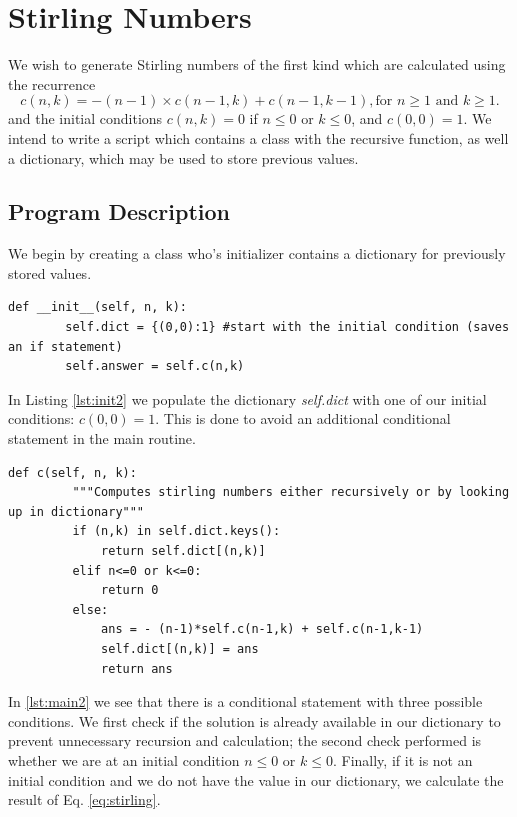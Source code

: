 \section{Stirling Numbers} %
\label{sec:stirling_numbers}
We wish to generate Stirling numbers of the first kind which are calculated using the recurrence
\begin{equation}
    \label{eq:stirling}
    c(n,k) = -(n-1)\times c(n-1,k) + c(n-1,k-1), \mbox{for } n \ge1 \mbox{ and } k \ge 1.
\end{equation}
and the initial conditions $c(n,k)=0$ if $n\le0$ or $k\le0$, and $c(0,0)=1$. We intend to write a script which contains a class with the recursive function, as well a dictionary, which may be used to store previous values.

\subsection{Program Description} %
\label{sub:program_description2}
We begin by creating a class who's initializer contains a dictionary for previously stored values.
\begin{lstlisting}[caption={Initialization}, label=lst:init2,firstnumber=3]
    def __init__(self, n, k):
        self.dict = {(0,0):1} #start with the initial condition (saves an if statement)
        self.answer = self.c(n,k)
\end{lstlisting}\noindent
In Listing \ref{lst:init2} we populate the dictionary \emph{self.dict} with one of our initial conditions: $c(0,0)=1$. This is done to avoid an additional conditional statement in the main routine.
\begin{lstlisting}[caption={Main Logic for Stirling Number Generation}, label=lst:main2,firstnumber=8]
    def c(self, n, k):
         """Computes stirling numbers either recursively or by looking up in dictionary"""
         if (n,k) in self.dict.keys():
             return self.dict[(n,k)]
         elif n<=0 or k<=0:
             return 0
         else:
             ans = - (n-1)*self.c(n-1,k) + self.c(n-1,k-1)
             self.dict[(n,k)] = ans
             return ans
\end{lstlisting}\noindent
In \ref{lst:main2} we see that there is a conditional statement with three possible conditions. We first check if the solution is already available in our dictionary to prevent unnecessary recursion and calculation; the second check performed is whether we are at an initial condition $n\le0$ or $k\le0$. Finally, if it is not an initial condition and we do not have the value in our dictionary, we calculate the result of Eq. \ref{eq:stirling}.

